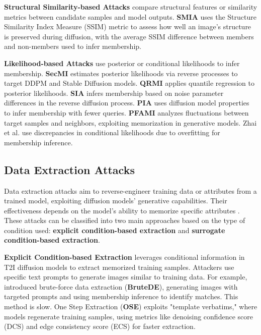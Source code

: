 \textbf{Structural Similarity-based Attacks} compare structural features or similarity metrics between candidate samples and model outputs. \textbf{SMIA} \cite{li2024unveiling} uses the Structure Similarity Index Measure (SSIM)\cite{wang2004image}
metric to assess how well an image's structure is preserved during diffusion, with the average SSIM difference between members and non-members used to infer membership.

\textbf{Likelihood-based Attacks} use posterior or conditional likelihoods to infer membership. \textbf{SecMI} \cite{duan2023diffusion} estimates posterior likelihoods via reverse processes to target DDPM and Stable Diffusion models. \textbf{QRMI} \cite{tang2023membership} applies quantile regression to posterior likelihoods. \textbf{SIA} \cite{qu2024very} infers membership based on noise parameter differences in the reverse diffusion process. \textbf{PIA} \cite{kong2023efficient} uses diffusion model properties to infer membership with fewer queries. \textbf{PFAMI} \cite{fu2023probabilistic} analyzes fluctuations between target samples and neighbors, exploiting memorization in generative models. Zhai et al. \cite{zhai2024membership} use discrepancies in conditional likelihoods due to overfitting for membership inference.


\subsection{Data Extraction Attacks}
\label{sec:dm_data_extraction_attacks}

Data extraction attacks aim to reverse-engineer training data or attributes from a trained model, exploiting diffusion models' generative capabilities. Their effectiveness depends on the model's ability to memorize specific attributes \cite{somepalli2023understanding,gu2023memorization,wen2024detecting,ren2024unveiling}. These attacks can be classified into two main approaches based on the type of condition used: \textbf{explicit condition-based extraction} and \textbf{surrogate condition-based extraction}.

\textbf{Explicit Condition-based Extraction} leverages conditional information in T2I diffusion models to extract memorized training samples. Attackers use specific text prompts to generate images similar to training data. For example, \cite{carlini2023extracting} introduced brute-force data extraction (\textbf{BruteDE}), generating images with targeted prompts and using membership inference to identify matches. This method is slow. One Step Extraction (\textbf{OSE}) \cite{webster2023reproducible} exploits "template verbatims," where models regenerate training samples, using metrics like denoising confidence score (DCS) and edge consistency score (ECS) for faster extraction.

